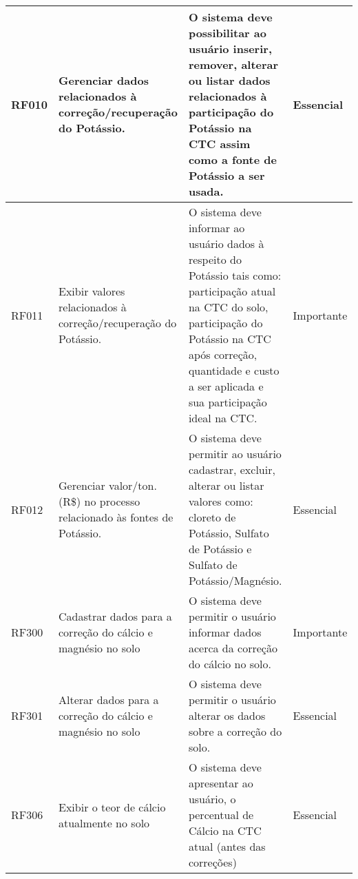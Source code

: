 \begin{longtable}{|p{1.5cm}|p{3cm}|p{7cm}|p{2.5cm}|}
    RF010 & Gerenciar dados relacionados à correção/recuperação do Potássio.                 & O sistema deve possibilitar ao usuário inserir, remover,  alterar ou listar dados relacionados à participação do Potássio na CTC assim como a fonte de Potássio a ser usada.                                                                                                                            & Essencial  \\\hline
    RF011 & Exibir valores relacionados à correção/recuperação do Potássio.                  & O sistema deve informar ao usuário dados à respeito do Potássio tais como: participação atual na CTC do solo,  participação do Potássio na CTC após correção, quantidade e custo a ser aplicada e sua participação ideal na CTC.                                                                        & Importante \\\hline
    RF012 & Gerenciar valor/ton. (R\$) no processo relacionado às fontes de Potássio.        & O sistema deve permitir ao usuário cadastrar, excluir, alterar ou listar valores como: cloreto de Potássio, Sulfato de Potássio e Sulfato de Potássio/Magnésio.                                                                                                                                         & Essencial  \\\hline
    RF300 & Cadastrar dados para a correção do cálcio e magnésio no solo                     & O sistema deve permitir o usuário informar dados acerca da correção do cálcio no solo.                                                                                                                                                                                                                  & Importante \\\hline
    RF301 & Alterar dados para a correção do cálcio e magnésio no solo                       & O sistema deve permitir o usuário alterar os dados sobre a correção do solo.                                                                                                                                                                                                                            & Essencial  \\\hline
    RF306 & Exibir o teor de cálcio atualmente no solo                                       & O sistema deve apresentar ao usuário, o percentual de Cálcio na CTC atual (antes das correções)                                                                                                                                                                                                         & Essencial  \\\hline

\end{longtable}
